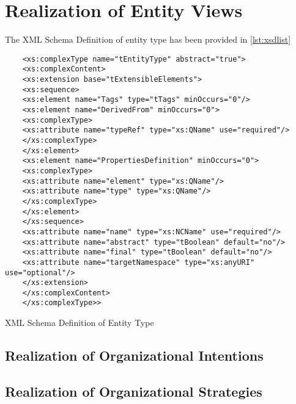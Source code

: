 \section{Realization of Entity Views}
\label{sec:realofentityviews}
The XML Schema Definition of entity type has been provided in \ref{lst:xsdlist}



\begin{Listing}
	\begin{lstlisting}
	<xs:complexType name="tEntityType" abstract="true">
	<xs:complexContent>
	<xs:extension base="tExtensibleElements">
	<xs:sequence>
	<xs:element name="Tags" type="tTags" minOccurs="0"/>
	<xs:element name="DerivedFrom" minOccurs="0">
	<xs:complexType>
	<xs:attribute name="typeRef" type="xs:QName" use="required"/>
	</xs:complexType>
	</xs:element>
	<xs:element name="PropertiesDefinition" minOccurs="0">
	<xs:complexType>
	<xs:attribute name="element" type="xs:QName"/>
	<xs:attribute name="type" type="xs:QName"/>
	</xs:complexType>
	</xs:element>
	</xs:sequence>
	<xs:attribute name="name" type="xs:NCName" use="required"/>
	<xs:attribute name="abstract" type="tBoolean" default="no"/>
	<xs:attribute name="final" type="tBoolean" default="no"/>
	<xs:attribute name="targetNamespace" type="xs:anyURI" use="optional"/>
	</xs:extension>
	</xs:complexContent>
	</xs:complexType>>
	\end{lstlisting}
	\caption{XML Schema Definition of Entity Type}
	\label{lst:xsdlist}
\end{Listing}

\subsection{Realization of Organizational Intentions}


\subsection{Realization of Organizational  Strategies}

